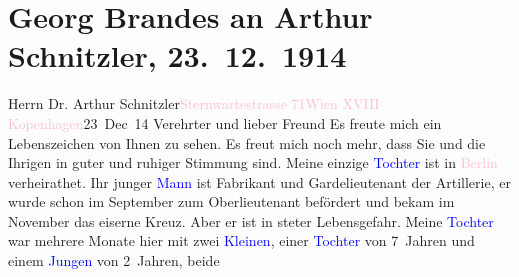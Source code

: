 

               \section[Georg Brandes an Arthur Schnitzler, 23. 12. 1914]{ Georg Brandes an Arthur Schnitzler, 23. 12. 1914}\nopagebreak{}\rehead{ }\normalsize\beginnumbering{} \toendnotes[C]{\smallbreak\pagebreak[2]} 
\toendnotes[C]{\smallbreak}\pstart{}{\pb}Herrn Dr. Arthur
                        Schnitzler\pend{}\pstart{}\textcolor{pink}{Sternwartestrasse 71}{}\ledrightnote{\textcolor{pink}{Sternwartestraße}}\pend{}\pstart{}\textcolor{pink}{Wien XVIII}{}\ledrightnote{\textcolor{pink}{XVIII., Währing}}\pend{}{\bigskip}\pstart
           \raggedleft{}{\pb}\textcolor{pink}{Kopenhagen}{}\ledrightnote{\textcolor{pink}{Kopenhagen}}{ }23 Dec 14\pend
           \pstart{}Verehrter und lieber Freund\pend\pstart
           Es freute mich ein Lebenszeichen von Ihnen zu sehen. Es freut mich noch mehr,
                    dass Sie und die Ihrigen in guter und ruhiger Stimmung sind. Meine einzige \textcolor{blue}{Tochter}{} ist in \textcolor{pink}{Berlin}{}\ledrightnote{\textcolor{pink}{Berlin}} verheirathet. Ihr junger \textcolor{blue}{Mann}{} ist Fabrikant und
                    Gardelieutenant der Artillerie, er wurde schon im September zum
                    Oberlieutenant befördert und bekam im November das eiserne Kreuz. Aber er ist in
                    steter Lebensgefahr. Meine \textcolor{blue}{Tochter}{} war mehrere Monate hier mit zwei \textcolor{blue}{Kleinen}{}, einer \textcolor{blue}{Tochter}{} von 7 Jahren und einem \textcolor{blue}{Jungen}{} von 2 Jahren, beide
